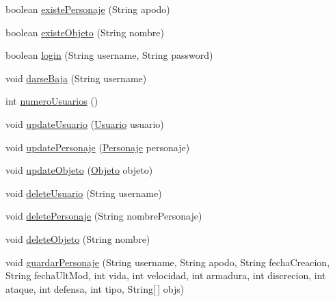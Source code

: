 \begin{DoxyCompactItemize}
\item 
boolean \hyperlink{classes_1_1deusto_1_1spq_1_1_t_e_scc_1_1servidor_1_1_d_a_o_database_ae067b1e69e717e0a88523b462eaeb10f}{existe\+Personaje} (String apodo)
\item 
boolean \hyperlink{classes_1_1deusto_1_1spq_1_1_t_e_scc_1_1servidor_1_1_d_a_o_database_ac3727abf0fa706b5d58dece142a7474f}{existe\+Objeto} (String nombre)
\item 
boolean \hyperlink{classes_1_1deusto_1_1spq_1_1_t_e_scc_1_1servidor_1_1_d_a_o_database_a388a4269d3d87f5b12e7146a7e910a41}{login} (String username, String password)
\item 
void \hyperlink{classes_1_1deusto_1_1spq_1_1_t_e_scc_1_1servidor_1_1_d_a_o_database_ac4cd95a3f339eb9d054a416797057876}{darse\+Baja} (String username)
\item 
int \hyperlink{classes_1_1deusto_1_1spq_1_1_t_e_scc_1_1servidor_1_1_d_a_o_database_a4b45faf87bd2ef4eafa2947c31cb1d07}{numero\+Usuarios} ()
\item 
void \hyperlink{classes_1_1deusto_1_1spq_1_1_t_e_scc_1_1servidor_1_1_d_a_o_database_aa829a249c2b4286d28afefc08881741e}{update\+Usuario} (\hyperlink{classes_1_1deusto_1_1spq_1_1_t_e_scc_1_1servidor_1_1jdo_1_1_usuario}{Usuario} usuario)
\item 
void \hyperlink{classes_1_1deusto_1_1spq_1_1_t_e_scc_1_1servidor_1_1_d_a_o_database_a48b1c16fe8733a837fc948b8d18e5ad4}{update\+Personaje} (\hyperlink{classes_1_1deusto_1_1spq_1_1_t_e_scc_1_1servidor_1_1jdo_1_1_personaje}{Personaje} personaje)
\item 
void \hyperlink{classes_1_1deusto_1_1spq_1_1_t_e_scc_1_1servidor_1_1_d_a_o_database_a20e9e6098a677e47f7139402544b2a1e}{update\+Objeto} (\hyperlink{classes_1_1deusto_1_1spq_1_1_t_e_scc_1_1servidor_1_1jdo_1_1_objeto}{Objeto} objeto)
\item 
void \hyperlink{classes_1_1deusto_1_1spq_1_1_t_e_scc_1_1servidor_1_1_d_a_o_database_af914be229a3f20df5cfed6ee7eae7d00}{delete\+Usuario} (String username)
\item 
void \hyperlink{classes_1_1deusto_1_1spq_1_1_t_e_scc_1_1servidor_1_1_d_a_o_database_ac22e24ebcd3bdc17f3f4d06521a01f80}{delete\+Personaje} (String nombre\+Personaje)
\item 
void \hyperlink{classes_1_1deusto_1_1spq_1_1_t_e_scc_1_1servidor_1_1_d_a_o_database_ae4d90cdabe336789edc17ac71aa3cc5a}{delete\+Objeto} (String nombre)
\item 
void \hyperlink{classes_1_1deusto_1_1spq_1_1_t_e_scc_1_1servidor_1_1_d_a_o_database_ad64a320332b866f4c145b7151e5e7d97}{guardar\+Personaje} (String username, String apodo, String fecha\+Creacion, String fecha\+Ult\+Mod, int vida, int velocidad, int armadura, int discrecion, int ataque, int defensa, int tipo, String\mbox{[}$\,$\mbox{]} objs)

\end{DoxyCompactItemize}
